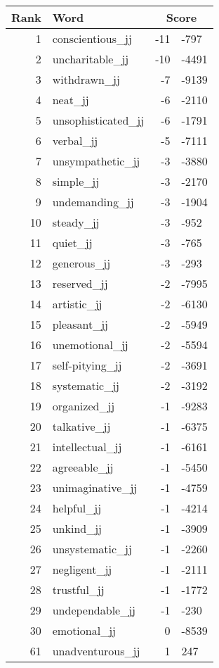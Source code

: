 \begin{longtable}[!htbp]{| rlr@{.}l |}
    \hline
    \textbf{Rank} & \textbf{Word} & \multicolumn{2}{c|}{\textbf{Score}} \\
    \hline
    \endhead
    1 & conscientious\_jj & -11 & -797 \\
    2 & uncharitable\_jj & -10 & -4491 \\
    3 & withdrawn\_jj & -7 & -9139 \\
    4 & neat\_jj & -6 & -2110 \\
    5 & unsophisticated\_jj & -6 & -1791 \\
    6 & verbal\_jj & -5 & -7111 \\
    7 & unsympathetic\_jj & -3 & -3880 \\
    8 & simple\_jj & -3 & -2170 \\
    9 & undemanding\_jj & -3 & -1904 \\
    10 & steady\_jj & -3 & -952 \\
    11 & quiet\_jj & -3 & -765 \\
    12 & generous\_jj & -3 & -293 \\
    13 & reserved\_jj & -2 & -7995 \\
    14 & artistic\_jj & -2 & -6130 \\
    15 & pleasant\_jj & -2 & -5949 \\
    16 & unemotional\_jj & -2 & -5594 \\
    17 & self-pitying\_jj & -2 & -3691 \\
    18 & systematic\_jj & -2 & -3192 \\
    19 & organized\_jj & -1 & -9283 \\
    20 & talkative\_jj & -1 & -6375 \\
    21 & intellectual\_jj & -1 & -6161 \\
    22 & agreeable\_jj & -1 & -5450 \\
    23 & unimaginative\_jj & -1 & -4759 \\
    24 & helpful\_jj & -1 & -4214 \\
    25 & unkind\_jj & -1 & -3909 \\
    26 & unsystematic\_jj & -1 & -2260 \\
    27 & negligent\_jj & -1 & -2111 \\
    28 & trustful\_jj & -1 & -1772 \\
    29 & undependable\_jj & -1 & -230 \\
    30 & emotional\_jj & 0 & -8539 \\
    61 & unadventurous\_jj & 1 & 247 \\

\end{longtable}

